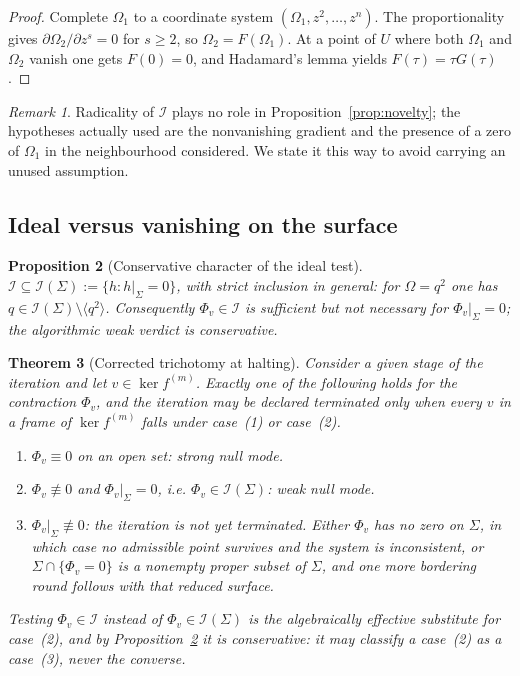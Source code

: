 \documentclass[12pt]{article}
\theoremstyle{plain}
\newtheorem{theorem}{Theorem}[section]
\newtheorem{proposition}[theorem]{Proposition}
\theoremstyle{definition}
\theoremstyle{remark}
\newtheorem{remark}[theorem]{Remark}
\newcommand{\Om}{\Omega}
\newcommand{\Ical}{\mathcal{I}}
\newcommand{\gen}[1]{\langle #1\rangle}
\begin{document}
	\begin{proof}
		Complete $\Om_{1}$ to a coordinate system $(\Om_{1},z^{2},\dots,z^{n})$. The
		proportionality gives $\partial\Om_{2}/\partial z^{s}=0$ for $s\geq2$, so
		$\Om_{2}=F(\Om_{1})$. At a point of $U$ where both $\Om_{1}$ and $\Om_{2}$
		vanish one gets $F(0)=0$, and Hadamard's lemma yields
		$F(\tau)=\tau G(\tau)$.
	\end{proof}
	
	\begin{remark}
		Radicality of $\Ical$ plays no role in Proposition~\ref{prop:novelty}; the
		hypotheses actually used are the nonvanishing gradient and the presence of a
		zero of $\Om_{1}$ in the neighbourhood considered. We state it this way to avoid
		carrying an unused assumption.
	\end{remark}
	
	\subsection{Ideal versus vanishing on the surface}
	
	\begin{proposition}[Conservative character of the ideal test]
		\label{prop:radical}
		$\Ical\subseteq\Ical(\Sigma):=\{h:h|_{\Sigma}=0\}$, with strict inclusion in
		general: for $\Om=q^{2}$ one has $q\in\Ical(\Sigma)\setminus\gen{q^{2}}$.
		Consequently $\Phi_{v}\in\Ical$ is sufficient but not necessary for
		$\Phi_{v}|_{\Sigma}=0$; the algorithmic weak verdict is conservative.
	\end{proposition}
	
	\begin{theorem}[Corrected trichotomy at halting]
		\label{thm:trichotomy}
		Consider a given stage of the iteration and let $v\in\ker f^{(m)}$. Exactly
		one of the following holds for the contraction $\Phi_{v}$, and the
		iteration may be declared terminated only when every $v$ in a frame of
		$\ker f^{(m)}$ falls under case~(1) or case~(2).
		\begin{enumerate}[label=(\arabic*),leftmargin=2.2em,itemsep=0.25em]
			\item $\Phi_{v}\equiv0$ on an open set: strong null mode.
			\item $\Phi_{v}\not\equiv0$ and $\Phi_{v}|_{\Sigma}=0$, i.e.
			$\Phi_{v}\in\Ical(\Sigma)$: weak null mode.
			\item $\Phi_{v}|_{\Sigma}\not\equiv0$: the iteration is not yet
			terminated. Either $\Phi_{v}$ has no zero on $\Sigma$, in which case no
			admissible point survives and the system is inconsistent, or
			$\Sigma\cap\{\Phi_{v}=0\}$ is a nonempty proper subset of $\Sigma$, and one
			more bordering round follows with that reduced surface.
		\end{enumerate}
		Testing $\Phi_{v}\in\Ical$ instead of $\Phi_{v}\in\Ical(\Sigma)$ is the
		algebraically effective substitute for case~(2), and by
		Proposition~\ref{prop:radical} it is conservative: it may classify a case~(2) as
		a case~(3), never the converse.
	\end{theorem}
	
\end{document}

